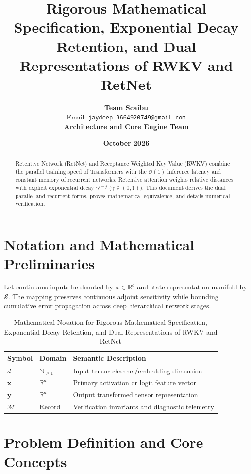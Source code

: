 \documentclass[11pt,a4paper]{article}
\title{\textbf{Rigorous Mathematical Specification, Exponential Decay Retention, and Dual Representations of RWKV and RetNet}}
\author{\textbf{Team Scaibu} \\ \small Email: \texttt{jaydeep.9664920749@gmail.com} \\ \small \textbf{Architecture and Core Engine Team}}
\date{\textbf{October 2026}}
\theoremstyle{definition}
\begin{document}
\maketitle

\begin{abstract}
Retentive Network (RetNet) and Receptance Weighted Key Value (RWKV) combine the parallel training speed of Transformers with the $\mathcal{O}(1)$ inference latency and constant memory of recurrent networks. Retentive attention weights relative distances with explicit exponential decay $\gamma^{i - j}$ ($\gamma \in (0, 1)$). This document derives the dual parallel and recurrent forms, proves mathematical equivalence, and details numerical verification.
\end{abstract}

\section{Notation and Mathematical Preliminaries}

Let continuous inputs be denoted by $\mathbf{x} \in \mathbb{R}^d$ and state representation manifold by $\mathcal{S}$. The mapping preserves continuous adjoint sensitivity while bounding cumulative error propagation across deep hierarchical network stages.

\begin{table}[h]
\centering
\caption{Mathematical Notation for Rigorous Mathematical Specification, Exponential Decay Retention, and Dual Representations of RWKV and RetNet}
\begin{tabular}{lll}
\toprule
\textbf{Symbol} & \textbf{Domain} & \textbf{Semantic Description} \\
\midrule
$d$ & $\mathbb{N}_{\ge 1}$ & Input tensor channel/embedding dimension \\
$\mathbf{x}$ & $\mathbb{R}^d$ & Primary activation or logit feature vector \\
$\mathbf{y}$ & $\mathbb{R}^d$ & Output transformed tensor representation \\
$\mathcal{M}$ & Record & Verification invariants and diagnostic telemetry \\
\bottomrule
\end{tabular}
\end{table}

\section{Problem Definition and Core Concepts}
\end{document}
